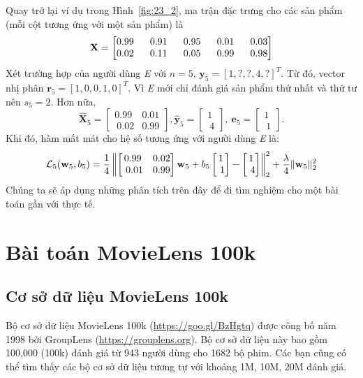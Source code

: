 Quay trở lại ví dụ trong Hình~\ref{fig:23_2}, ma trận đặc trưng cho
các sản phẩm (mỗi cột tương ứng với một sản phẩm) là
\begin{equation}
\mathbf{X} = \left[\begin{matrix}
0.99 &~~ 0.91 &~~ 0.95 &~~ 0.01 &~~ 0.03 \\
0.02 &~~ 0.11 &~~ 0.05 &~~ 0.99 &~~ 0.98
\end{matrix}\right]
\end{equation}
Xét trường hợp của người dùng \textit{E} với $n = 5$, $\mathbf{y}_5 = [1, ?, ?, 4,
?]^T$. Từ đó, vector nhị phân $\mathbf{r}_5 = [1, 0, 0, 1, 0]^T$. Vì \textit{E} mới chỉ
đánh giá sản phẩm thứ nhất và thứ tư nên $s_5 = 2$. Hơn nữa,
\begin{equation}
\hat{\mathbf{X}}_5 =
\left[\begin{matrix} 0.99 & 0.01 \\\ 0.02 & 0.99 \end{matrix} \right],
\hat{\mathbf{y}}_5 = \left[\begin{matrix} 1 \\\ 4 \end{matrix} \right], ~ \mathbf{e}_5 = \left[\begin{matrix} 1 \\\ 1 \end{matrix} \right].
\end{equation}
Khi đó, hàm mất mát cho hệ số tương ứng với người dùng \textit{E} là:
\begin{equation}
\mathcal{L}_5(\mathbf{w}_5, b_5) = \frac{1}{4} \left\|
\left[\begin{matrix} 0.99 & 0.02 \\\
0.01 & 0.99 \end{matrix}\right]\mathbf{w}_5  + b_5\left[\begin{matrix}  1 \\\ 1 \end{matrix}\right] -
\left[\begin{matrix}  1 \\\ 4 \end{matrix}\right]
\right\|_2^2 + \frac{\lambda}{4} \|\mathbf{w}_5\|_2^2
\end{equation}
Chúng ta sẽ áp dụng những phân tích trên đây để đi tìm nghiệm cho một bài toán gần với thực tế.


\section{Bài toán MovieLens 100k }


\subsection{Cơ sở dữ liệu MovieLens 100k}

Bộ cơ sở dữ liệu MovieLens 100k (\url{https://goo.gl/BzHgtq}) được công bố năm
1998 bởi {GroupLens} (\url{https://grouplens.org}). Bộ cơ sở dữ liệu này bao gồm
100,000 (100k) đánh giá từ 943 người dùng cho 1682 bộ phim. Các bạn
cũng có
thể tìm thấy các bộ cơ sở dữ liệu tương tự với khoảng 1M, 10M, 20M đánh giá.

